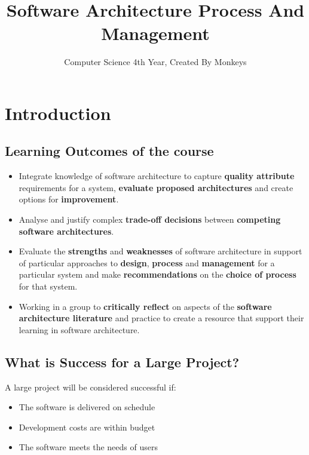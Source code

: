 \documentclass[a4paper]{article}
\begin{document}
\title{Software Architecture Process And Management}
\date{}
\author{Computer Science 4th Year, Created By Monkeys}
\maketitle
\newpage

\tableofcontents
\newpage


\section{Introduction}

\subsection{Learning Outcomes of the course}
\begin{itemize}
\item Integrate knowledge of software architecture to capture \textbf{quality attribute} requirements for a system, \textbf{evaluate proposed architectures} and create options for \textbf{improvement}.

\item Analyse and justify complex \textbf{trade-off decisions} between \textbf{competing software architectures}.

\item Evaluate the \textbf{strengths} and \textbf{weaknesses} of software architecture in support of particular approaches to \textbf{design}, \textbf{process} and \textbf{management} for a particular system and make \textbf{recommendations} on the \textbf{choice of process} for that system.

\item Working in a group to \textbf{critically reflect} on aspects of the \textbf{software architecture literature} and practice to create a resource that support their learning in software architecture.
\end{itemize}

\subsection{What is Success for a Large Project?}
A large project will be considered successful if:
\begin{itemize}
\item The software is delivered on schedule
\item Development costs are within budget
\item The software meets the needs of users
\end{itemize}
\end{document}

